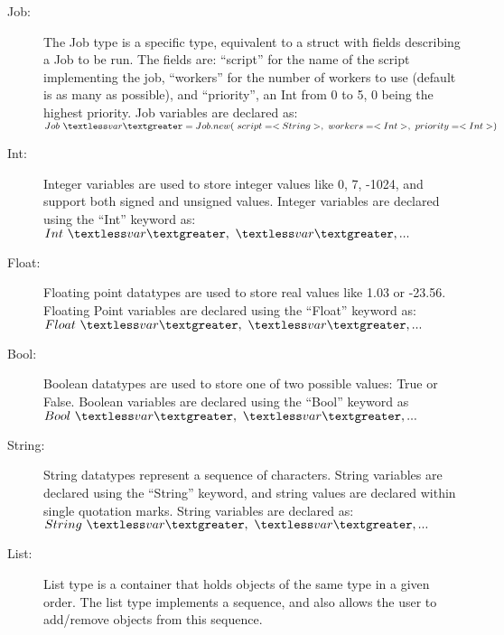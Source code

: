 \begin{description}
\item [Job:] The Job type is a \lang{} specific type, equivalent to a struct
with fields describing a Job to be run. The fields are: ``script'' for the
name of the script implementing the job, ``workers'' for the number of workers
to use (default is as many as possible), and ``priority'', an Int from 0 to 5,
0 being the
highest priority.
Job variables are declared as:
$Job~\textless var\textgreater = Job.new(~script=<String>,~workers=<Int>,~priority=<Int>)$

\item [Int:] Integer variables are used to store integer values like 0, 7,
-1024, and support both signed and unsigned values. Integer variables are
declared using the ``Int'' keyword as:
$Int~\textless var\textgreater,~\textless var\textgreater, ...$


\item [Float:] Floating point datatypes are used to store real values like
1.03 or -23.56. Floating Point variables are declared using the ``Float''
keyword as:
$Float~\textless  var\textgreater,~\textless  var\textgreater, ...$



\item [Bool:] Boolean datatypes are used to store one of two possible values:
True or False. Boolean variables are declared using the ``Bool'' keyword as
$Bool~\textless  var\textgreater,~\textless  var\textgreater, ...$
%



\item [String:] String datatypes represent a sequence of characters. String
variables are declared using the ``String'' keyword, and string values are 
declared within single quotation marks.
String variables are declared as:
$String~\textless var\textgreater,~\textless  var\textgreater, ...$


\item [List:]
List type is a container that holds objects of the same type in a given order.
The list type implements a sequence, and also allows the user to add/remove
objects from this sequence.


\end{description}
